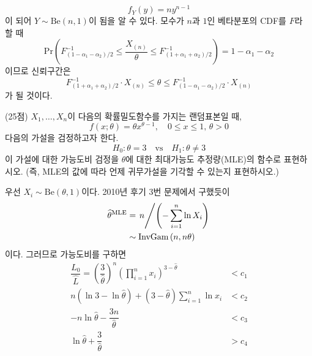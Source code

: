 \documentclass[answers]{exam}
\begin{document}
\begin{questions}
\begin{solution}
\begin{enumerate}[(a)]
\begin{equation}
          f_{Y}\left(y\right) = ny^{n-1}
        \end{equation}
        이 되어 $Y\sim \mathrm{Be}\left(n,1\right)$이 됨을 알 수 있다. 모수가 $n$과 $1$인 베타분포의 CDF를 $F$라 할 때
        \begin{equation}
          \mathrm{Pr}\left(F_{\left(1-\alpha_{1}-\alpha_{2}\right)/2}^{-1}\leq \dfrac{X_{\left(n\right)}}{\theta}\leq F_{\left(1+\alpha_{1}+\alpha_{2}\right)/2}^{-1}\right)=1-\alpha_{1}-\alpha_{2}
        \end{equation}
        이므로 신뢰구간은
        \begin{equation}
          F_{\left(1+\alpha_{1}+\alpha_{2}\right)/2}^{-1}\cdot X_{\left(n\right)}\leq \theta\leq F_{\left(1-\alpha_{1}-\alpha_{2}\right)/2}^{-1}\cdot X_{\left(n\right)}
        \end{equation}
        가 될 것이다.
      \end{enumerate}
    \end{solution}
    \question
    (25점) $X_{1},\ldots,X_{n}$이 다음의 확률밀도함수를 가지는 랜덤표본일 때,
    $$
      f\left(x;\theta\right)=\theta x^{\theta-1},\quad 0\leq x \leq 1,\, \theta>0
    $$
    다음의 가설을 검정하고자 한다.
    $$
      H_{0}:\theta=3 \quad \text{vs} \quad H_{1}:\theta\neq 3
    $$
    이 가설에 대한 가능도비 검정을 $\theta$에 대한 최대가능도 추정량(MLE)의 함수로 표현하시오. (즉, MLE의 값에 따라 언제 귀무가설을 기각할 수 있는지 표현하시오.)
    \begin{solution}
      우선 $X_{i}\sim \mathrm{Be}\left(\theta,1\right)$이다. 2010년 후기 3번 문제에서 구했듯이
        \begin{align}
          \widehat{\theta}^{\text{MLE}} &= \left.n\middle/\left(-\sum_{i=1}^{n}\ln X_{i}\right)\right.\\
          &\sim \mathrm{InvGam}\left(n,n\theta\right)
        \end{align}
        이다. 그러므로 가능도비를 구하면
        \begin{align}
          \dfrac{L_{0}}{\widehat{L}} = \left(\dfrac{3}{\widehat{\theta}}\right)^{n}\left(\prod_{i=1}^{n}x_{i}\right)^{3-\widehat{\theta}} &< c_{1}\\
          n\left(\ln3-\ln\widehat{\theta}\right)+\left(3-\widehat{\theta}\right)\sum_{i=1}^{n}\ln x_{i}&<c_{2}\\
          -n\ln\widehat{\theta}-\dfrac{3n}{\widehat{\theta}}&<c_{3}\\
          \ln\widehat{\theta}+\dfrac{3}{\widehat{\theta}}&>c_{4}
        \end{align}

\end{solution}
\end{questions}
\end{document}
